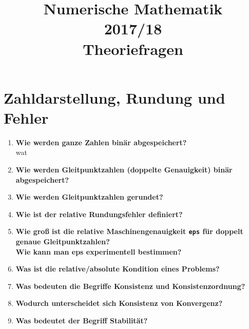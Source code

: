 \documentclass[10pt,a4paper]{article}
\begin{document}
	\title{Numerische Mathematik
		\\
		2017/18
		\\
		\flushbottom
		Theoriefragen }
	\maketitle
	
	\newpage
	\section{Zahldarstellung, Rundung und Fehler}
	\begin{enumerate}
		\item \textbf{Wie werden ganze Zahlen binär abgespeichert?}\\
			wat
		\item \textbf{Wie werden Gleitpunktzahlen (doppelte Genauigkeit) binär abgespeichert?} \\
		\item \textbf{Wie werden Gleitpunktzahlen gerundet?} \\
		\item \textbf{Wie ist der relative Rundungsfehler definiert?} \\
		\item \textbf{Wie groß ist die relative Maschinengenauigkeit \texttt{eps} für doppelt genaue Gleitpunktzahlen?\\
					Wie kann man eps experimentell bestimmen?} \\
		\item \textbf{Was ist die relative/absolute Kondition eines Problems?} \\
		\item \textbf{Was bedeuten die Begriffe Konsistenz und Konsistenzordnung?} \\
		\item \textbf{Wodurch unterscheidet sich Konsistenz von Konvergenz?} \\
		\item \textbf{Was bedeutet der Begriff Stabilität?}
	\end{enumerate}
	
	\newpage
\end{document}
